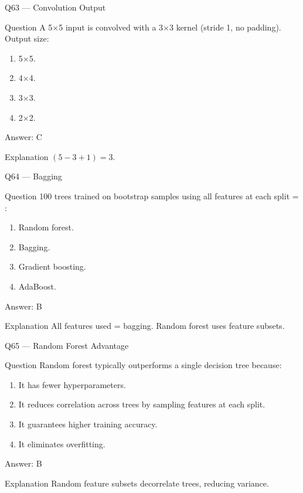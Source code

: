 \documentclass[aspectratio=169,8pt]{beamer}
\begin{document}
	\begin{frame}{Q63 --- Convolution Output}
		\begin{block}{Question}
			A 5$\times$5 input is convolved with a 3$\times$3 kernel (stride 1, no padding). Output size:
		\end{block}
		\begin{enumerate}
			\item 5$\times$5.
			\item 4$\times$4.
			\item 3$\times$3.
			\item 2$\times$2.
		\end{enumerate}
		\begin{exampleblock}{Answer: C}\end{exampleblock}
		\begin{block}{Explanation}
			$(5-3+1) = 3$.
		\end{block}
	\end{frame}
	
	\begin{frame}{Q64 --- Bagging}
		\begin{block}{Question}
			100 trees trained on bootstrap samples using all features at each split = :
		\end{block}
		\begin{enumerate}
			\item Random forest.
			\item Bagging.
			\item Gradient boosting.
			\item AdaBoost.
		\end{enumerate}
		\begin{exampleblock}{Answer: B}\end{exampleblock}
		\begin{block}{Explanation}
			All features used = bagging. Random forest uses feature subsets.
		\end{block}
	\end{frame}
	
	\begin{frame}{Q65 --- Random Forest Advantage}
		\begin{block}{Question}
			Random forest typically outperforms a single decision tree because:
		\end{block}
		\begin{enumerate}
			\item It has fewer hyperparameters.
			\item It reduces correlation across trees by sampling features at each split.
			\item It guarantees higher training accuracy.
			\item It eliminates overfitting.
		\end{enumerate}
		\begin{exampleblock}{Answer: B}\end{exampleblock}
		\begin{block}{Explanation}
			Random feature subsets decorrelate trees, reducing variance.
		\end{block}
	\end{frame}
	
\end{document}
